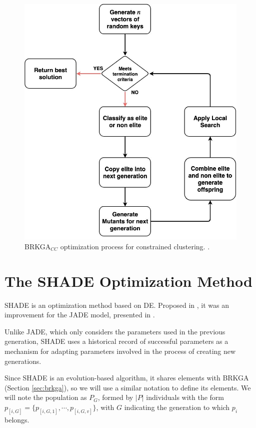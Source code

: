 \begin{figure}[!h]
	\centering
	\includegraphics[scale=0.4]{gfx/NewProp/SHADE/BRKGA_Diagram.jpg} 
	\caption[BRKGA$_{CC}$ optimization process for constrained clustering.]{\acs{BRKGA}$_{CC}$ optimization process for constrained clustering. \cite{de2017comparison}.}\label{fig:BRKGA_CC}
\end{figure}

\section{The SHADE Optimization Method} \label{sec:SHADE}

\acf{SHADE} is an optimization method based on \acs{DE}. Proposed in \cite{tanabe2013success}, it was an improvement for the JADE model, presented in \cite{zhang2009jade}.

Unlike JADE, which only considers the parameters used in the previous generation, \acs{SHADE} uses a historical record of successful parameters as a mechanism for adapting parameters involved in the process of creating new generations.

Since \acs{SHADE} is an evolution-based algorithm, it shares elements with \acs{BRKGA} (Section \ref{sec:brkga}), so we will use a similar notation to define its elements. We will note the population as $P_G$, formed by $|P|$ individuals with the form $p_{[i,G]} = \{p_{[i,G,1]}, \cdots, p_{[i,G,v]}\}$, with $G$ indicating the generation to which $p_i$ belongs.

